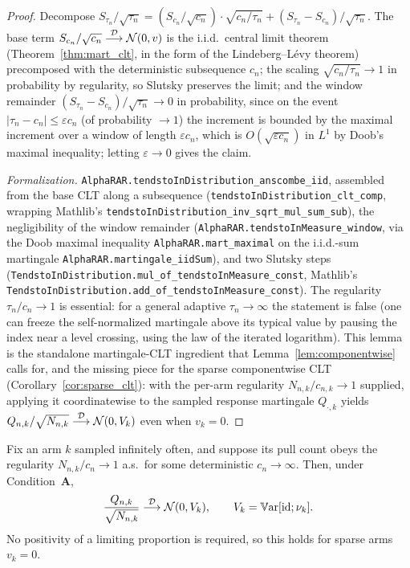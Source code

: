 \begin{proof}\leanok
{}
Decompose
$S_{\tau_n}/\sqrt{\tau_n}=(S_{c_n}/\sqrt{c_n})\cdot\sqrt{c_n/\tau_n}+(S_{\tau_n}-S_{c_n})/\sqrt{\tau_n}$.
The base term $S_{c_n}/\sqrt{c_n}\overset{\mathcal{D}}{\longrightarrow}\mathcal N(0,v)$ is the i.i.d.\ central limit theorem
(Theorem~\ref{thm:mart_clt}, in the form of the Lindeberg--L\'evy theorem) precomposed with the
deterministic subsequence $c_n$; the scaling $\sqrt{c_n/\tau_n}\to1$ in probability by regularity, so
Slutsky preserves the limit; and the window remainder $(S_{\tau_n}-S_{c_n})/\sqrt{\tau_n}\to0$ in
probability, since on the event $|\tau_n-c_n|\le\varepsilon c_n$ (of probability $\to1$) the increment
is bounded by the maximal increment over a window of length $\varepsilon c_n$, which is
$O(\sqrt{\varepsilon c_n})$ in $L^1$ by Doob's maximal inequality; letting $\varepsilon\to0$ gives the
claim.

\emph{Formalization.} \texttt{AlphaRAR.tendstoInDistribution\_anscombe\_iid}, assembled from the
base CLT along a subsequence (\texttt{tendstoInDistribution\_clt\_comp}, wrapping Mathlib's
\texttt{tendstoInDistribution\_inv\_sqrt\_mul\_sum\_sub}), the negligibility of the window remainder
(\texttt{AlphaRAR.tendstoInMeasure\_window}, via the Doob maximal inequality
\texttt{AlphaRAR.mart\_maximal} on the i.i.d.-sum martingale \texttt{AlphaRAR.martingale\_iidSum}),
and two Slutsky steps (\texttt{TendstoInDistribution.mul\_of\_tendstoInMeasure\_const},
Mathlib's \texttt{TendstoInDistribution.add\_of\_tendstoInMeasure\_const}). The regularity
$\tau_n/c_n\to1$ is
essential: for a general adaptive $\tau_n\to\infty$ the statement is false (one can freeze the
self-normalized martingale above its typical value by pausing the index near a level crossing, using
the law of the iterated logarithm). This lemma is the standalone martingale-CLT ingredient that
Lemma~\ref{lem:componentwise} calls for, and the missing piece for the sparse componentwise CLT
(Corollary~\ref{cor:sparse_clt}): with the per-arm regularity $N_{n,k}/c_{n,k}\to1$ supplied, applying
it coordinatewise to the sampled response martingale $Q_{\cdot,k}$ yields
$Q_{n,k}/\sqrt{N_{n,k}}\overset{\mathcal{D}}{\longrightarrow}\mathcal N(0,V_k)$ even when $v_k=0$.
\end{proof}

\begin{lemma}\label{lem:mart_clt_selfnorm_arm_sparse}
\leanok
{}
Fix an arm $k$ sampled infinitely often, and suppose its pull count obeys the regularity
$N_{n,k}/c_n\to1$ a.s.\ for some deterministic $c_n\to\infty$. Then, under Condition~\textbf{A},
\[
  \frac{Q_{n,k}}{\sqrt{N_{n,k}}} \overset{\mathcal{D}}{\longrightarrow} \mathcal N(0, V_k),\qquad V_k=\mathbb{V}\mathrm{ar}[\mathrm{id};\nu_k].
\]
No positivity of a limiting proportion is required, so this holds for sparse arms $v_k=0$.
\end{lemma}

